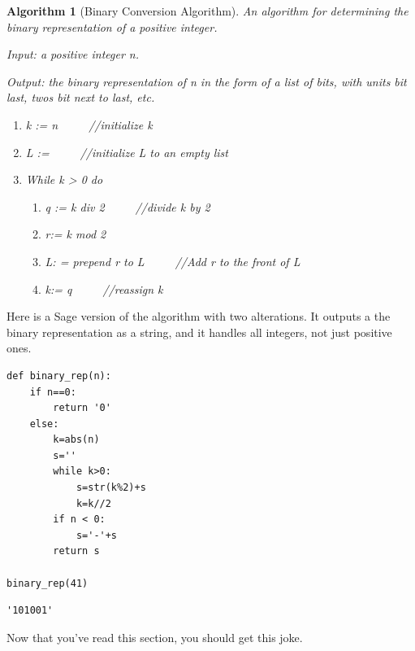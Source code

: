 \documentclass[10pt,]{book}
\theoremstyle{plain}
\newtheorem{algorithm}[theorem]{Algorithm}
\theoremstyle{definition}
\theoremstyle{definition}
\theoremstyle{definition}
\theoremstyle{definition}
\begin{document}
\begin{algorithm}[Binary Conversion Algorithm]\label{binary_conversion_algorithm}
 An algorithm for determining the binary representation of a positive integer.%
\par
Input: a positive integer n.%
\par
Output: the binary representation of n in the form of a list of bits, with units bit last, twos bit next to last, etc.%
\par
\leavevmode%
\begin{enumerate}[label=\arabic*]
\item\hypertarget{li-175}{}k := n \(\qquad  \)     //initialize k%
\item\hypertarget{li-176}{}L := { } \(\qquad  \)   //initialize L to an empty list%
\item\hypertarget{li-177}{} While k > 0 do %
\par
%
\begin{enumerate}[label=\alph*]
\item\hypertarget{li-178}{} q := k div 2		\(\qquad  \)	//divide k by 2%
\item\hypertarget{li-179}{} r:= k mod 2 %
\item\hypertarget{li-180}{}L: = prepend r to L \(\qquad  \) //Add r to the front of L %
\item\hypertarget{li-181}{} k:= q   			\(\qquad  \)	//reassign k%
\end{enumerate}
%
\end{enumerate}
%
\end{algorithm}
\par
Here is a Sage version of the algorithm with two alterations. It outputs a the binary representation as a string, and it handles all integers, not just positive ones.%
\begin{lstlisting}[style=sageinput]
def binary_rep(n):
    if n==0:
        return '0'
    else:
        k=abs(n)
        s=''
        while k>0:
            s=str(k%2)+s
            k=k//2
        if n < 0:
            s='-'+s
        return s
 
binary_rep(41)
\end{lstlisting}
\begin{lstlisting}[style=sageoutput]
'101001'
\end{lstlisting}
\par
Now that you've read this section, you should get this joke.%
\leavevmode%
\end{document}

